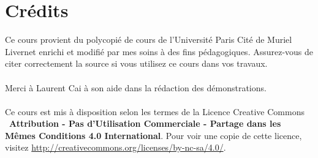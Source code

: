 \documentclass{article}
\begin{document}
\newpage
\tableofcontents
\section*{Crédits}
Ce cours provient du polycopié de cours de l'Université Paris Cité de Muriel Livernet enrichi et modifié par mes soins à des fins pédagogiques. Assurez-vous de citer correctement la source si vous utilisez ce cours dans vos travaux.\\\\
Merci à Laurent Cai à son aide dans la rédaction des démonstrations.\\\\
Ce cours est mis à disposition selon les termes de la Licence Creative Commons \ccbyncsa\ \textbf{Attribution - Pas d'Utilisation Commerciale - Partage dans les Mêmes Conditions 4.0 International}. 
Pour voir une copie de cette licence, visitez \url{http://creativecommons.org/licenses/by-nc-sa/4.0/}.
\end{document}
